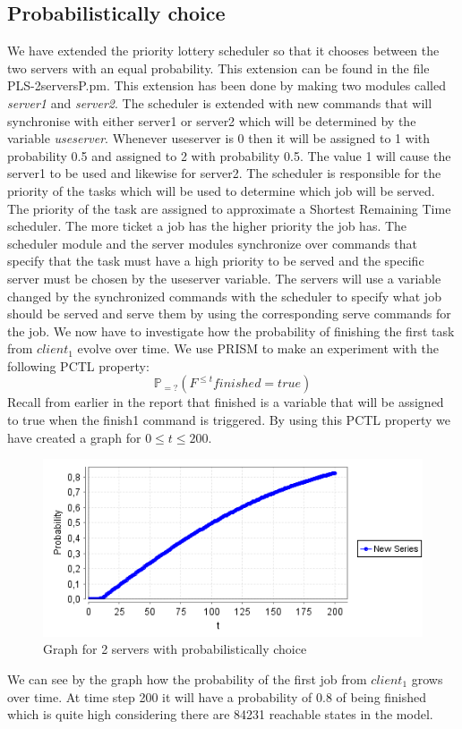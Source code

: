 \documentclass[12pt]{report}
\begin{document}
\subsection*{Probabilistically choice}
We have extended the priority lottery scheduler so that it chooses between the two servers with an equal probability. This extension can be found in the file PLS-2serversP.pm. This extension has been done by making two modules called \emph{server1} and \emph{server2}. The scheduler is extended with new commands that will synchronise with either server1 or server2 which will be determined by the variable \emph{useserver}. Whenever useserver is 0 then it will be assigned to 1 with probability 0.5 and assigned to 2 with probability 0.5. The value 1 will cause the server1 to be used and likewise for server2. The scheduler is responsible for the priority of the tasks which will be used to determine which job will be served. The priority of the task are assigned to approximate a Shortest Remaining Time scheduler. The more ticket a job has the higher priority the job has. The scheduler module and the server modules synchronize over commands that specify that the task must have a high priority to be served and the specific server must be chosen by the useserver variable. The servers will use a variable changed by the synchronized commands with the scheduler to specify what job should be served and serve them by using the corresponding serve commands for the job. We now have to investigate how the probability of finishing the first task from $client_1$ evolve over time. We use PRISM to make an experiment with the following PCTL property:
$$\mathbb{P}_{=?}( F^{\leq t} finished=true)$$
Recall from earlier in the report that finished is a variable that will be assigned to true when the finish1 command is triggered. By using this PCTL property we have created a graph for $0 \leq t \leq 200$.
\begin{figure}[H]
	\begin{center}
		\includegraphics[scale=0.75]{../GFX/C1.png}
	\end{center}
	\caption{Graph for 2 servers with probabilistically choice}
\end{figure}
We can see by the graph how the probability of the first job from $client_1$ grows over time. At time step 200 it will have a probability of 0.8 of being finished which is quite high considering there are 84231 reachable states in the model.
\end{document}
